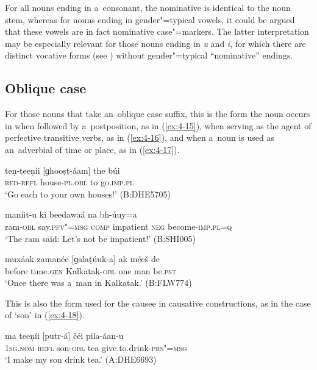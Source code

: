For all nouns ending in a~consonant, the nominative is identical to the noun stem, whereas for nouns ending in gender"=typical vowels, it could be argued that these vowels are in fact nominative case"=markers. The latter interpretation may be especially relevant for those nouns ending in \textit{u} and \textit{i}, for which there are distinct vocative forms (see ) without gender"=typical ``nominative'' endings.

\subsection{Oblique case}
\label{subsec:4-5-2}

For those nouns that take an~oblique case suffix, this is the form the noun occurs in when followed by a~postposition, as in (\ref{ex:4-15}), when serving as the agent of perfective transitive verbs, as in (\ref{ex:4-16}), and when a~noun is used as an~adverbial of time or place, as in (\ref{ex:4-17}). 


\begin{exe}
\ex
\label{ex:4-15}
\gll teṇ-teeṇíi [ɡhooṣṭ-áam] the búi\\
	\textsc{red}-\textsc{refl} house-\textsc{pl.obl} to go.\textsc{imp.pl} \\
\glt `Go each to your own houses!' (B:DHE5705)
\end{exe}

\begin{exe}
\ex
\label{ex:4-16}
\gll [míḍ-a] maníit-u ki beedawaá na bh-úuy=a \\
	ram-\textsc{obl} say.\textsc{pfv"=msg} \textsc{comp} impatient \textsc{neg} become-\textsc{imp.pl=q} \\
\glt `The ram said: Let's not be impatient!' (B:SHI005)
\end{exe}

\begin{exe}
\ex
\label{ex:4-17}
\gll muxáak zamanée [ɡalaṭúuk-a] ak méeš de \\
	before time.\textsc{gen} Kalkatak-\textsc{obl} one man be.\textsc{pst} \\
\glt `Once there was a~man in Kalkatak.' (B:FLW774)
\end{exe}

This is also the form used for the causee in causative constructions, as in the case of `son' in (\ref{ex:4-18}). 


\begin{exe}
\ex
\label{ex:4-18}
\gll ma teeṇíi [putr-á] čéi pila-áan-u \\
	\textsc{1sg.nom} \textsc{refl} son-\textsc{obl} tea give.to.drink-\textsc{prs"=msg} \\
\glt `I make my son drink tea.' (A:DHE6693)
\end{exe}

